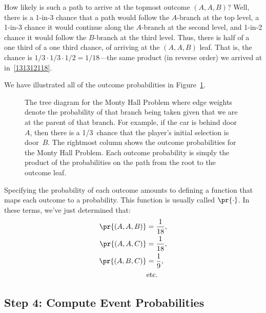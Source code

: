 How likely is such a path to arrive at the topmost outcome $(A, A,
B)$?  Well, there is a 1-in-3 chance that a path would follow the
$A$-branch at the top level, a 1-in-3 chance it would continue along
the $A$-branch at the second level, and 1-in-2 chance it would follow
the $B$-branch at the third level.  Thus, there is half of a one third
of a one third chance, of arriving at the $(A, A, B)$ leaf.  That is,
the chance is $1/3 \cdot 1/3 \cdot 1/2 = 1/18$---the same product (in
reverse order) we arrived at in~\eqref{131312118}.

We have illustrated all of the outcome probabilities in
Figure~\ref{fig:14A6}.

\begin{figure}


\caption{The tree diagram for the Monty Hall Problem where edge
  weights denote the probability of that branch being taken given that
  we are at the parent of that branch.  For example, if the car is
  behind door~$A$, then there is a 1/3~chance that the player's
  initial selection is door~$B$.
  The rightmost column shows the outcome probabilities for the
  Monty Hall Problem.  Each outcome probability is simply the product
  of the probabilities on the path from the root to
  the outcome leaf.}

\label{fig:14A6}
\end{figure}

Specifying the probability of each outcome amounts to defining a
function that maps each outcome to a probability.  This function is
usually called $\pr{\cdot}$.  In these terms, we've just determined
that:
\begin{align*}
\pr{(A, A, B)} & = \frac{1}{18}, \\
\pr{(A, A, C)} & = \frac{1}{18}, \\
\pr{(A, B, C)} & = \frac{1}{9}, \\
               & \text{etc.}
\end{align*}

\subsection{Step 4: Compute Event Probabilities}

